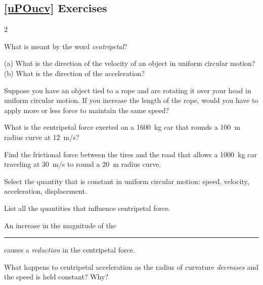 \documentclass[dvipsnames]{article}
\numberwithin{equation}{section}
\numberwithin{figure}{section}
\begin{document}
\subsection*{\ref{uPOucv} Exercises}
\begin{multicols}{2}
\begin{exercise} \label{x2YCzr}
    What is meant by the word \textit{centripetal}?
\end{exercise}

\begin{exercise} \label{S4rGIt}
    (a) What is the direction of the velocity of an object in uniform circular motion? (b) What is the direction of the acceleration?
\end{exercise}

\begin{exercise} \label{aVu3ZA}
    Suppose you have an object tied to a rope and are rotating it over your head in uniform circular motion. If you increase the length of the rope, would you have to apply more or less force to maintain the same speed?
\end{exercise}

\begin{exercise} \label{DeBjJa}
    What is the centripetal force exerted on a \SI{1600}{kg} car that rounds a \SI{100}{m} radius curve at \SI{12}{m/s}?
\end{exercise}

\begin{exercise} \label{MJm5VE}
    Find the frictional force between the tires and the road that allows a \SI{1000}{kg} car traveling at \SI{30}{m/s} to round a \SI{20}{m} radius curve.
\end{exercise}

\begin{exercise} \label{fsjtBV}
    Select the quantity that is constant in uniform circular motion: speed, velocity, acceleration, displacement.
\end{exercise}

\begin{exercise} \label{GD8Yff}
    List all the quantities that influence centripetal force.
\end{exercise}

\begin{exercise} \label{aEtlVz}
    An increase in the magnitude of the \rule{2cm}{0.15mm} causes a \textit{reduction} in the centripetal force.
\end{exercise}

\begin{exercise} \label{5lauZ6}
    What happens to centripetal acceleration as the radius of curvature \textit{decreases} and the speed is held constant? Why?
\end{exercise}


\end{multicols}
\end{document}
